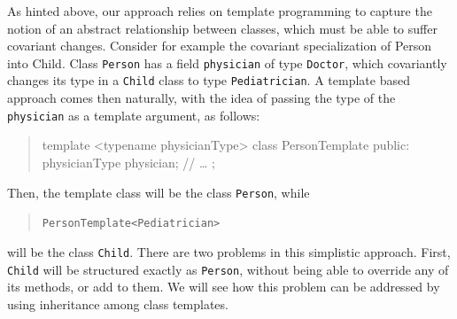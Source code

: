 \documentclass[11pt]{article}
\numberwithin{figure}{section}
\newcommand{\cd}[1]{\texttt{#1}}
\newcommand\Cls[1]{\textsf{#1}}
\newenvironment{excerpt}{\begin{quote}\begin{minipage}\textwidth}{\end{minipage}\end{quote}}
\begin{document}
As hinted above, our approach relies on template programming
    to capture the notion of an abstract relationship between classes,
    which must be able to suffer covariant changes.
Consider for example the covariant specialization of
    \Cls{Person} into \Cls{Child}.
Class \cd{Person} has a field
    \cd{physician} of type \cd{Doctor},
    which covariantly changes its type in a \cd{Child} class
    to type \cd{Pediatrician}.
A template based approach comes then naturally, with
    the idea of passing the type of the \cd{physician}
    as a template argument, as follows:
\begin{excerpt}
\CPP
    template <typename physicianType>
        class PersonTemplate { public:
            physicianType physician;
            //{} \ldots
        };
\END\PROGbh{}
\end{excerpt}
Then, the template class \PROGbi{}
    will be the class \cd{Person}, while \begin{quotation}
    \cd{PersonTemplate<Pediatrician>}
    \end{quotation}
    will be the class \cd{Child}.
There are two problems in this simplistic approach.
First, \cd{Child} will be structured exactly as
    \cd{Person}, without being able to override any of its methods,
    or add to them.
We will see how this problem can be addressed by using inheritance among class
    templates.
\end{document}
